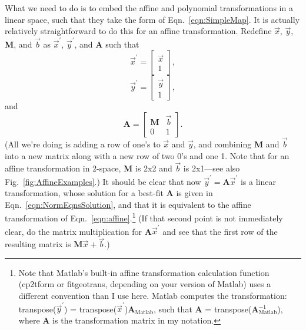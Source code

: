 \documentclass[11pt]{article}
\begin{document}
What we need to do is to embed the affine and polynomial transformations in a linear space, such that they take the form of Eqn.~\eqref{eqn:SimpleMap}. It is actually relatively straightforward to do this for an affine transformation. Redefine $\vec{x}$, $\vec{y}$, {\bf M}, and $\vec{b}$ as $\vec{x}^\prime$, $\vec{y}^\prime$, and {\bf A} such that 
\begin{equation}
\vec{x}^\prime = \left[ \begin{matrix} \vec{x} \\ 1 \end{matrix} \right],
\end{equation}
\begin{equation}
\vec{y}^\prime = \left[ \begin{matrix} \vec{y} \\ 1 \end{matrix} \right],
\end{equation}
and
\begin{equation}
\mathbf{A} = \left[ \begin{matrix} \mathbf{M} & \vec{b} \\
							0 & 1 \end{matrix} \right].
\end{equation}
(All we're doing is adding a row of one's to $\vec{x}$ and $\vec{y}$, and combining {\bf M} and $\vec{b}$ into a new matrix along with a new row of two 0's and one 1.  Note that for an affine transformation in 2-space, {\bf M} is 2x2 and $\vec{b}$ is 2x1---see also Fig.~\ref{fig:AffineExamples}.) It should be clear that now $\vec{y}^\prime = \mathbf{A}\vec{x}^\prime$ is a linear transformation, whose solution for a best-fit {\bf A} is given in Eqn.~\eqref{eqn:NormEqnsSolution}, and that it is equivalent to the affine transformation of Eqn.~\eqref{eqn:affine}.\footnote{Note that Matlab's built-in affine transformation calculation function (cp2tform or fitgeotrans, depending on your version of Matlab) uses a different convention than I use here. Matlab computes the transformation: transpose($\vec{y}^\prime$) = transpose($\vec{x}^\prime$){\bf A}$_{\textrm{Matlab}}$, such that {\bf A} = transpose({\bf A}$_{\textrm{Matlab}}^{-1}$), where {\bf A} is the transformation matrix in my notation.}  (If that second point is not immediately clear, do the matrix multiplication for {\bf A}$\vec{x}^\prime$ and see that the first row of the resulting matrix is $\mathbf{M}\vec{x}+\vec{b}$.)
\end{document}
